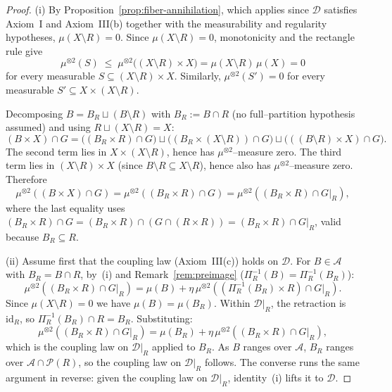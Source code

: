 \documentclass[11pt]{article}
\numberwithin{equation}{section}
\theoremstyle{definition}
\begin{document}
\begin{proof}
(i) By Proposition~\ref{prop:fiber-annihilation}, which applies since $\mathcal D$ satisfies Axiom~I and Axiom~III(b) together with the measurability and regularity hypotheses, $\mu(X\setminus R)=0$. Since $\mu(X\setminus R)=0$, monotonicity and the rectangle rule give
\[
\mu^{\otimes2}(S)\;\le\;\mu^{\otimes2}\bigl((X\setminus R)\times X\bigr)=\mu(X\setminus R)\,\mu(X)=0
\]
for every measurable $S\subseteq(X\setminus R)\times X$. Similarly, $\mu^{\otimes2}(S')=0$ for every measurable $S'\subseteq X\times(X\setminus R)$.

Decomposing $B=B_R\sqcup(B\setminus R)$ with $B_R:=B\cap R$ (no full--partition hypothesis assumed) and using $R\sqcup(X\setminus R)=X$:
\[
(B\times X)\cap G
=\bigl((B_R\times R)\cap G\bigr)\sqcup\bigl((B_R\times(X\setminus R))\cap G\bigr)\sqcup\bigl(((B\setminus R)\times X)\cap G\bigr).
\]
The second term lies in $X\times(X\setminus R)$, hence has $\mu^{\otimes2}$--measure zero. The third term lies in $(X\setminus R)\times X$ (since $B\setminus R\subseteq X\setminus R$), hence also has $\mu^{\otimes2}$--measure zero. Therefore
\[
\mu^{\otimes2}((B\times X)\cap G)=\mu^{\otimes2}((B_R\times R)\cap G)=\mu^{\otimes2}((B_R\times R)\cap G|_R),
\]
where the last equality uses $(B_R\times R)\cap G=(B_R\times R)\cap(G\cap(R\times R))=(B_R\times R)\cap G|_R$, valid because $B_R\subseteq R$.

(ii) Assume first that the coupling law (Axiom~III(c)) holds on $\mathcal D$. For $B\in\mathcal A$ with $B_R=B\cap R$, by~(i) and Remark~\ref{rem:preimage} ($\Pi_R^{-1}(B)=\Pi_R^{-1}(B_R)$):
\[
\mu^{\otimes2}((B_R\times R)\cap G|_R)=\mu(B)+\eta\,\mu^{\otimes2}((\Pi_R^{-1}(B_R)\times R)\cap G|_R).
\]
Since $\mu(X\setminus R)=0$ we have $\mu(B)=\mu(B_R)$. Within $\mathcal D|_R$, the retraction is $\mathrm{id}_R$, so $\Pi_R^{-1}(B_R)\cap R=B_R$. Substituting:
\[
\mu^{\otimes2}((B_R\times R)\cap G|_R)=\mu(B_R)+\eta\,\mu^{\otimes2}((B_R\times R)\cap G|_R),
\]
which is the coupling law on $\mathcal D|_R$ applied to $B_R$. As $B$ ranges over $\mathcal A$, $B_R$ ranges over $\mathcal A\cap\mathcal P(R)$, so the coupling law on $\mathcal D|_R$ follows. The converse runs the same argument in reverse: given the coupling law on $\mathcal D|_R$, identity~(i) lifts it to $\mathcal D$.


\end{proof}
\end{document}

